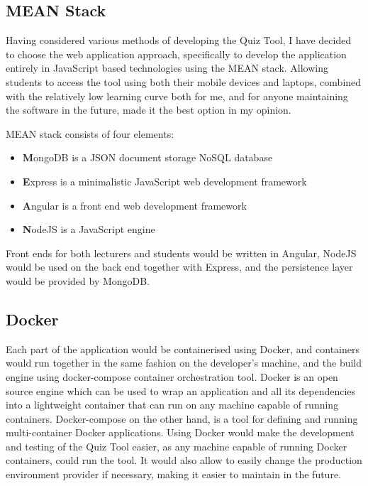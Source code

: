 \subsection{MEAN Stack}
Having considered various methods of developing the Quiz Tool, I have decided to
choose the web application approach, specifically to develop the application entirely
in JavaScript based technologies using the MEAN stack\cite{18}.
Allowing students to access the tool using both
their mobile devices and laptops, combined with the relatively low learning curve
both for me, and for anyone maintaining the software in the future, made it the best
option in my opinion.

MEAN stack consists of four elements:
\begin{itemize}
  \item \textbf{M}ongoDB is a JSON document storage NoSQL database
  \item \textbf{E}xpress is a minimalistic JavaScript web development framework
  \item \textbf{A}ngular is a front end web development framework
  \item \textbf{N}odeJS is a JavaScript engine
\end{itemize}

Front ends for both lecturers and students would be written in Angular, NodeJS would be
used on the back end together with Express, and the persistence layer would be provided
by MongoDB.

\subsection{Docker}
Each part of the application would be containerised using Docker\cite{19}, and containers
would run together in the same fashion on the developer's machine, and the build engine
using docker-compose\cite{20} container orchestration tool. Docker is an open source
engine which can be used to wrap an application and all its dependencies into a
lightweight container that can run on any machine capable of running containers\cite{21}.
Docker-compose on the other hand, is a tool for defining and running multi-container
Docker applications. Using Docker would make the development and testing of the Quiz
Tool easier, as any machine capable of running Docker containers, could run the tool.
It would also allow to easily change the production environment provider if necessary,
making it easier to maintain in the future.

